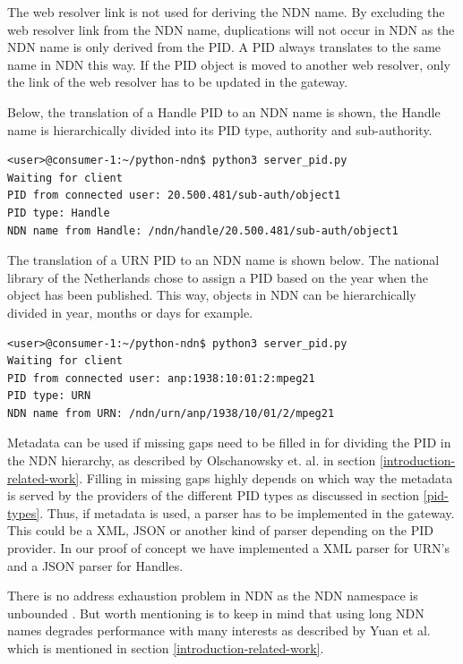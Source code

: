 The web resolver link is not used for deriving the NDN name.
By excluding the web resolver link from the NDN name, duplications will not occur in NDN as the NDN name is only derived from the PID. A PID always translates to the same name in NDN this way. 
If the PID object is moved to another web resolver, only the link of the web resolver has to be updated in the gateway. 

Below, the translation of a Handle PID to an NDN name is shown, the Handle name is hierarchically divided into its PID type, authority and sub-authority.
\vspace{1em}
\begin{lstlisting}[frame=single,gobble=0,basicstyle=\scriptsize\ttfamily]
<user>@consumer-1:~/python-ndn$ python3 server_pid.py
Waiting for client
PID from connected user: 20.500.481/sub-auth/object1
PID type: Handle
NDN name from Handle: /ndn/handle/20.500.481/sub-auth/object1
\end{lstlisting}

The translation of a URN PID to an NDN name is shown below. The national library of the Netherlands chose to assign a PID based on the year when the object has been published. 
This way, objects in NDN can be hierarchically divided in year, months or days for example.
\vspace{1em}
\begin{lstlisting}[frame=single,gobble=0,basicstyle=\scriptsize\ttfamily]
<user>@consumer-1:~/python-ndn$ python3 server_pid.py
Waiting for client
PID from connected user: anp:1938:10:01:2:mpeg21
PID type: URN
NDN name from URN: /ndn/urn/anp/1938/10/01/2/mpeg21
\end{lstlisting}

Metadata can be used if missing gaps need to be filled in for dividing the PID in the NDN hierarchy, as described by Olschanowsky et. al. \cite{ndn-clim} in section \ref{introduction-related-work}. 
Filling in missing gaps highly depends on which way the metadata is served by the providers of the different PID types as discussed in section \ref{pid-types}. Thus, if metadata is used, a parser has to be implemented in the gateway. This could be a XML, JSON or another kind of parser depending on the PID provider. In our proof of concept we have implemented a XML parser for URN's and a JSON parser for Handles.

There is no address exhaustion problem in NDN as the NDN namespace is unbounded \cite{ndn-nspace}. But worth mentioning is to keep in mind that using long NDN names degrades performance with many interests as described by Yuan et al. \cite{yuan2012scalable} 
which is mentioned in section \ref{introduction-related-work}.

